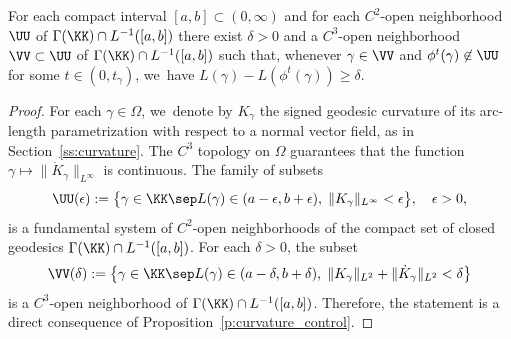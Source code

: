 \begin{Lemma}\label{l:encapsulated_nbhds}
For each compact interval $[a,b]\subset(0,\infty)$ and for each $C^2$-open neighborhood $\UU$ of $\Gamma(\KK)\cap L^{-1}([a,b])$ there exist $\delta>0$ and a $C^3$-open neighborhood $\VV\subset\UU$ of $\Gamma(\KK)\cap L^{-1}([a,b])$ such that, whenever $\gamma\in\VV$ and $\phi^t(\gamma)\not\in\UU$ for some $t\in(0,t_\gamma)$, we~have $L(\gamma)-L(\phi^t(\gamma))\geq\delta$.
\end{Lemma}

\begin{proof}
For each $\gamma\in\Omega$, we~denote by $K_\gamma$ the signed geodesic curvature of its arc-length parametrization with respect to a normal vector field, as in Section~\ref{ss:curvature}.
The $C^3$ topology on $\Omega$ guarantees that the function $\gamma\mapsto\|\dot K_\gamma\|_{L^\infty}$ is continuous.
The family of subsets
\[
\UU(\epsilon):=\big\{ \gamma\in\KK\sep L(\gamma)\in(a-\epsilon,b+\epsilon),\; \|K_\gamma\|_{L^\infty}<\epsilon \big\},\quad \epsilon>0,
\]
is a fundamental system of $C^2$-open neighborhoods of the compact set of closed geodesics $\Gamma(\KK)\cap L^{-1}([a,b])$. For each $\delta>0$, the subset
\[
\VV(\delta):=\big\{ \gamma\in\KK\sep L(\gamma)\in(a-\delta,b+\delta),\; \|K_\gamma\|_{L^2}+\|\dot K_\gamma\|_{L^2}<\delta \big\}
\]
is a $C^3$-open neighborhood of $\Gamma(\KK)\cap L^{-1}([a,b])$. Therefore, the statement is a direct consequence of Proposition~\ref{p:curvature_control}.
\end{proof}


